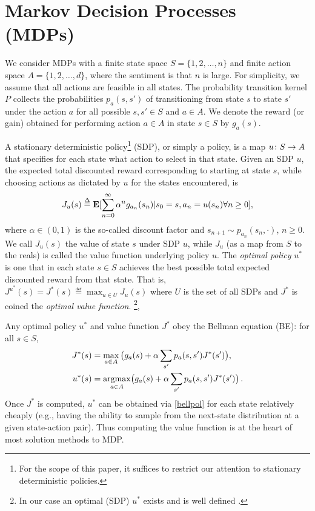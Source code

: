 \section{Markov Decision Processes (MDPs)}
We consider MDPs with a finite state space $S=\{1,2,\ldots,n\}$ and finite action space $A=\{1,2,\ldots,d\}$, where the sentiment is that $n$ is large. For simplicity, we assume that all actions are feasible in all states. The probability transition kernel $P$ collects the probabilities $p_a(s,s')$ of transitioning from state $s$ to state $s'$ under the action $a$ for all possible $s,s'\in S$ and $a\in A$. We denote the reward (or gain) obtained for performing action $a\in A$ in state $s\in S$ by $g_a(s)$.

A stationary deterministic policy\footnote{For the scope of this paper, it suffices to restrict our attention to stationary deterministic policies.} (SDP), or simply a policy, is a map $u\colon S\rightarrow A$ that specifies for each state what action to select in that state.
Given an SDP $u$, the expected total discounted reward corresponding to starting at state $s$, while choosing actions as dictated by $u$ for the states encountered, is
\begin{align}
J_u(s)\stackrel{\Delta}{=}\mathbf{E}[\sum_{n=0}^\infty \alpha^n g_{a_n}(s_n)|s_0=s,a_n=u(s_n)\relax{ }\forall n\geq 0],\nonumber
\end{align}
where $\alpha \in (0,1)$ is the so-called discount factor and $s_{n+1} \sim p_{a_n}(s_n,\cdot)$, $n\ge 0$. 
We call $J_u(s)$ the value of state $s$ under SDP $u$, while $J_u$ (as a map from $S$ to the reals)
is called the value function underlying policy $u$.
The \emph{optimal policy} $u^*$ is one that in each state $s\in S$ achieves the best possible total expected discounted reward from that state. That is, $J^{u^*}(s) = J^*(s) \eqdef \max_{u\in U} J_u(s)$
where $U$ is the set of all SDPs and $J^*$ is coined the \emph{optimal value function}.%
\footnote{In our case an optimal (SDP) $u^*$ exists and is well defined \cite{BertB}.}, 


Any optimal policy $u^*$ and value function $J^*$ obey the Bellman equation (BE): for all $ s \in S$, 
\begin{subequations}\label{bell}
\begin{align}
\label{bellval}J^*(s)&=\max_{ a\in A}\big(g_a(s)+\alpha \sum_{s'}p_a(s,s')J^*(s')\big),\\
\label{bellpol}u^*(s)&= \underset{a\in A}{\argmax}\big(g_a(s)+\alpha \sum_{s'}p_a(s,s')J^*(s')\big)\,.
\end{align}
\end{subequations}
Once $J^*$ is computed, $u^*$ can be obtained via \eqref{bellpol}
for each state relatively cheaply (e.g., having the ability to sample from the next-state distribution at
a given state-action pair).
Thus computing the value function is at the heart of most solution methods to MDP.

